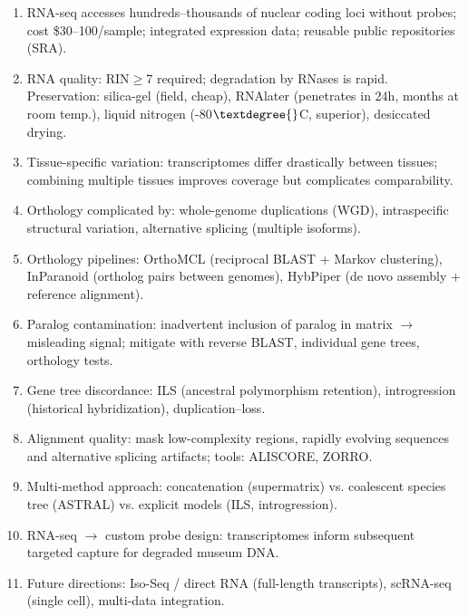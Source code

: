 \clearpage
\begin{revise}\small
\begin{enumerate}[itemsep=0pt, topsep=0pt, parsep=0pt]
    \item RNA-seq accesses hundreds--thousands of nuclear coding loci without probes; cost \$30--100/sample; integrated expression data; reusable public repositories (SRA).
    \item RNA quality: RIN$\geq$7 required; degradation by RNases is rapid. Preservation: silica-gel (field, cheap), RNAlater (penetrates in 24h, months at room temp.), liquid nitrogen (-80$\textdegree{}$C, superior), desiccated drying.
    \item Tissue-specific variation: transcriptomes differ drastically between tissues; combining multiple tissues improves coverage but complicates comparability.
    \item Orthology complicated by: whole-genome duplications (WGD), intraspecific structural variation, alternative splicing (multiple isoforms).
    \item Orthology pipelines: OrthoMCL (reciprocal BLAST + Markov clustering), InParanoid (ortholog pairs between genomes), HybPiper (de novo assembly + reference alignment).
    \item Paralog contamination: inadvertent inclusion of paralog in matrix $\to$ misleading signal; mitigate with reverse BLAST, individual gene trees, orthology tests.
    \item Gene tree discordance: ILS (ancestral polymorphism retention), introgression (historical hybridization), duplication--loss.
    \item Alignment quality: mask low-complexity regions, rapidly evolving sequences and alternative splicing artifacts; tools: ALISCORE, ZORRO.
    \item Multi-method approach: concatenation (supermatrix) vs. coalescent species tree (ASTRAL) vs. explicit models (ILS, introgression).
    \item RNA-seq $\to$ custom probe design: transcriptomes inform subsequent targeted capture for degraded museum DNA.
    \item Future directions: Iso-Seq / direct RNA (full-length transcripts), scRNA-seq (single cell), multi-data integration.
\end{enumerate}
\end{revise}

\clearpage

\printbibliography[heading=subbibliography,title={References}]

